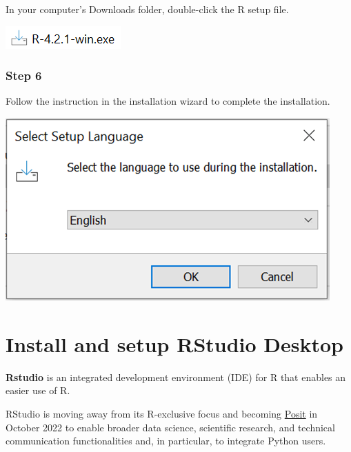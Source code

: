\documentclass[
  letterpaper,
  DIV=11,
  numbers=noendperiod]{scrreprt}
\begin{document}
In your computer's Downloads folder, double-click the R setup file.

\includegraphics{./images/paste-FD7C97A4.png}

\hypertarget{step-6}{%
\subsubsection{Step 6}\label{step-6}}

Follow the instruction in the installation wizard to complete the
installation.

\includegraphics{./images/paste-0F242DBF.png}

\hypertarget{sec-RStudio-installation}{%
\section{Install and setup RStudio
Desktop}\label{sec-RStudio-installation}}

\textbf{Rstudio} is an integrated development environment (IDE) for R
that enables an easier use of R.

\begin{tcolorbox}[enhanced jigsaw, colframe=quarto-callout-note-color-frame, colback=white, rightrule=.15mm, bottomrule=.15mm, left=2mm, arc=.35mm, coltitle=black, title=\textcolor{quarto-callout-note-color}{\faInfo}\hspace{0.5em}{Note}, opacitybacktitle=0.6, bottomtitle=1mm, opacityback=0, toptitle=1mm, toprule=.15mm, colbacktitle=quarto-callout-note-color!10!white, titlerule=0mm, leftrule=.75mm, breakable]
RStudio is moving away from its R-exclusive focus and becoming
\href{https://posit.co/}{Posit} in October 2022 to enable broader data
science, scientific research, and technical communication
functionalities and, in particular, to integrate Python users.
\end{tcolorbox}
\end{document}
